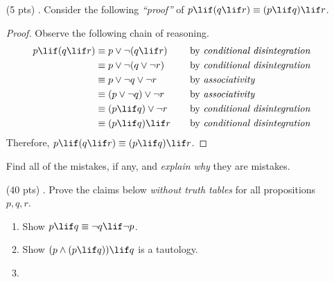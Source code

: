 \begin{enumerate}
  \item[(5 pts) \quad 1.]
    Consider the following \emph{``proof''} of $p \lif (q \lif r) \equiv (p \lif q) \lif r$.
    \begin{mdframed}
      \vspace{2ex}
      \begin{proof}
        Observe the following chain of reasoning.
        \begin{align*}
          p \lif (q \lif r)
            &\equiv p \lor \neg(q \lif r)
              &\quad
              &\text{by \emph{conditional disintegration}} \\
            &\equiv p \lor \neg(q \lor \neg r)
              &\quad
              &\text{by \emph{conditional disintegration}} \\
            &\equiv p \lor \neg q \lor \neg r
              &\quad
              &\text{by \emph{associativity}} \\
            &\equiv (p \lor \neg q) \lor \neg r
              &\quad
              &\text{by \emph{associativity}} \\
            &\equiv (p \lif q) \lor \neg r
              &\quad
              &\text{by \emph{conditional disintegration}} \\
            &\equiv (p \lif q) \lif r
              &\quad
              &\text{by \emph{conditional disintegration}}
        \end{align*}
        Therefore, $p \lif (q \lif r) \equiv (p \lif q) \lif r$.
      \end{proof}
    \end{mdframed}
    Find all of the mistakes, if any, and \emph{explain why} they are mistakes.
  \item[(40 pts) \quad 2.]
    Prove the claims below \emph{without truth tables} for all propositions $p, q, r$.
    \begin{enumerate}
      \item
        Show $p \lif q \equiv \neg q \lif \neg p$.
      \item
        Show $(p \land (p \lif q)) \lif q$ is a tautology.
      \item

\end{enumerate}
\end{enumerate}
